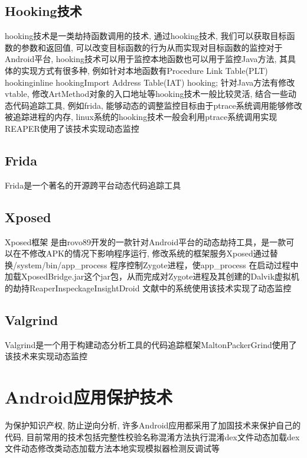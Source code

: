 \subsection{Hooking技术}
hooking技术是一类劫持函数调用的技术, 通过hooking技术, 我们可以获取目标函数的参数和返回值, 可以改变目标函数的行为从而实现对目标函数的监控\juhao 对于Android平台, hooking技术可以用于监控本地函数也可以用于监控Java方法, 其具体的实现方式有很多种, 例如针对本地函数有Procedure Link Table(PLT) hooking\dunhao inline hooking\dunhao Import Address Table(IAT) hooking; 针对Java方法有修改vtable, 修改ArtMethod对象的入口地址等\juhao hooking技术一般比较灵活, 结合一些动态代码追踪工具, 例如frida, 能够动态的调整监控目标\juhao 由于ptrace系统调用能够修改被追踪进程的内存, linux系统的hooking技术一般会利用ptrace系统调用实现\juhao REAPER使用了该技术实现动态监控\juhao

\subsection{Frida}
\label{frida}
Frida是一个著名的开源跨平台动态代码追踪工具\juhao 

\subsection{Xposed}
 Xposed框架 是由rovo89开发的一款针对Android平台的动态劫持工具，是一款可以在不修改APK的情况下影响程序运行, 修改系统的框架服务\juhao Xposed通过替换/system/bin/app\_process 程序控制Zygote进程，使app\_process 在启动过程中加载XposedBridge.jar这个jar包，从而完成对Zygote进程及其创建的Dalvik虚拟机的劫持\juhao Reaper\dunhao Inspeckage\dunhao InsightDroid 文献\cite{chinese2}中的系统使用该技术实现了动态监控\juhao 

\subsection{Valgrind}
Valgrind是一个用于构建动态分析工具的代码追踪框架\juhao Malton\dunhao PackerGrind使用了该技术来实现动态监控\juhao 

\section{Android应用保护技术}
为保护知识产权, 防止逆向分析, 许多Android应用都采用了加固技术来保护自己的代码, 目前常用的技术包括完整性校验\dunhao 名称混淆\dunhao 方法执行混淆\dunhao dex文件动态加载\dunhao dex文件动态修改\dunhao 类动态加载\dunhao 方法本地实现\dunhao 模拟器检测\dunhao 反调试等\juhao

